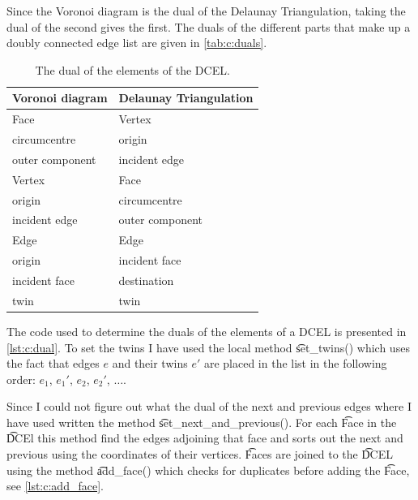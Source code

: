 Since the Voronoi diagram is the dual of the Delaunay Triangulation, taking the dual of the second gives the first. The duals of the different parts that make up a doubly connected edge list are given in \autoref{tab:c:duals}.

\begin{table}
	\centering
	\begin{tabular}{ll}
		Voronoi diagram 	& Delaunay Triangulation\\
		\hline
		\hline
		Face 				& Vertex\\
		\hline
		circumcentre 		& origin\\
		outer component 	& incident edge\\
		\hline
		Vertex 				& Face\\
		\hline
		origin 				& circumcentre\\
		incident edge 		& outer component\\
		\hline
		Edge 				& Edge\\
		\hline
		origin 				& incident face\\
		incident face 		& destination\\
		twin 				& twin\\
	\end{tabular}
	\caption{The dual of the elements of the DCEL.}
	\label{tab:c:duals}
\end{table}

The code used to determine the duals of the elements of a DCEL is presented in \autoref{lst:c:dual}. To set the twins I have used the local method \t{set_twins()} which uses the fact that edges $e$ and their twins $e'$ are placed in the list in the following order: $e_1$, $e_1'$, $e_2$, $e_2'$, $\ldots$.



Since I could not figure out what the dual of the next and previous edges where I have used written the method \t{set_next_and_previous()}. For each \t{Face} in the \t{DCEl} this method find the edges adjoining that face and sorts out the next and previous using the coordinates of their vertices. \t{Face}s are joined to the \t{DCEL} using the method \t{add_face()} which checks for duplicates before adding the \t{Face}, see \autoref{lst:c:add_face}.



